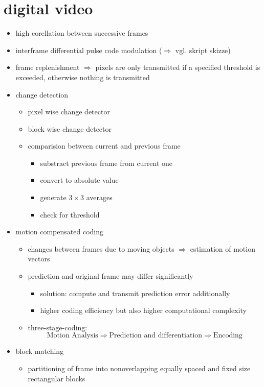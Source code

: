 \documentclass[a4paper,10pt]{scrreprt}
\begin{document}
\section{digital video}
\begin{itemize}
 \item high corellation between successive frames
 \item interframe differential pulse code modulation ($\Rightarrow$ vgl. skript skizze)
 \item frame replenishment $\Rightarrow$ pixels are only transmitted if a specified threshold is exceeded, otherwise nothing is transmitted
 \item change detection
 \begin{itemize}
  \item pixel wise change detector
  \item block wise change detector
  \item comparision between current and previous frame
  \begin{itemize}
   \item substract previous frame from current one
   \item convert to absolute value
   \item generate $3\times 3$ averages
   \item check for threshold
  \end{itemize}
 \end{itemize}
 \item motion compensated coding 
 \begin{itemize}
  \item changes between frames due to moving objects $\Rightarrow$ estimation of motion vectors
  \item prediction and original frame may differ significantly
  \begin{itemize}
   \item solution: compute and transmit prediction error additionally
   \item higher coding efficiency but also higher computational complexity
  \end{itemize}
  \item three-stage-coding:
  \[ \text{Motion Analysis} \Rightarrow \text{Prediction and differentiation} \Rightarrow \text{Encoding} \]
 \end{itemize}
 \item block matching
 \begin{itemize}
  \item partitioning of frame into nonoverlapping equally spaced and fixed size rectangular blocks

\end{itemize}
\end{itemize}
\end{document}

